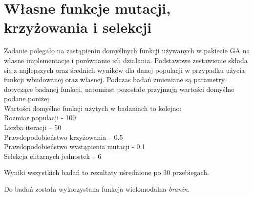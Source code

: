 \section{Własne funkcje mutacji, krzyżowania i selekcji}

Zadanie polegało na zastąpieniu domyślnych funkcji używanych w pakiecie GA na własne implementacje i porównanie ich działania. Podstawowe zestawienie składa się z najlepszych oraz średnich wyników dla danej populacji w przypadku użycia funkcji wbudowanej oraz własnej. Podczas badań zmieniane są parametry dotyczące badanej funkcji, natomiast pozostałe przyjmują wartości domyślne podane poniżej.\\

Wartości domyślne funkcji użytych w badaniach to kolejno:\\
Rozmiar populacji - 100\\
Liczba iteracji – 50\\
Prawdopodobieństwo krzyżowania – 0.5\\
Prawdopodobieństwo wystąpienia mutacji - 0.1\\
Selekcja elitarnych jednostek – 6\\
\newline

Wyniki wszystkich badań to rezultaty uśrednione po 30 przebiegach.\\
\newline

Do badań została wykorzystana funkcja wielomodalna \textit{branin}.



